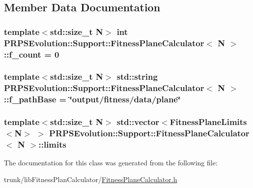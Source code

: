 \subsection{\-Member \-Data \-Documentation}
\hypertarget{class_p_r_p_s_evolution_1_1_support_1_1_fitness_plane_calculator_a3caff6f9344aa5fe2acd0815b2d55bbe}{
\subsubsection[{f\-\_\-count}]{\setlength{\rightskip}{0pt plus 5cm}template$<$std\-::size\-\_\-t \-N$>$ int {\bf \-P\-R\-P\-S\-Evolution\-::\-Support\-::\-Fitness\-Plane\-Calculator}$<$ \-N $>$\-::{\bf f\-\_\-count} = 0}}\label{class_p_r_p_s_evolution_1_1_support_1_1_fitness_plane_calculator_a3caff6f9344aa5fe2acd0815b2d55bbe}
\hypertarget{class_p_r_p_s_evolution_1_1_support_1_1_fitness_plane_calculator_ac49be73b0a0e5e8642f3a328061f75cb}{
\subsubsection[{f\-\_\-path\-Base}]{\setlength{\rightskip}{0pt plus 5cm}template$<$std\-::size\-\_\-t \-N$>$ std\-::string {\bf \-P\-R\-P\-S\-Evolution\-::\-Support\-::\-Fitness\-Plane\-Calculator}$<$ \-N $>$\-::{\bf f\-\_\-path\-Base} = \char`\"{}output/fitness/data/plane\char`\"{}}}\label{class_p_r_p_s_evolution_1_1_support_1_1_fitness_plane_calculator_ac49be73b0a0e5e8642f3a328061f75cb}
\hypertarget{class_p_r_p_s_evolution_1_1_support_1_1_fitness_plane_calculator_a9caf2e6ac9dec08e8d052c57f0455f18}{
\subsubsection[{limits}]{\setlength{\rightskip}{0pt plus 5cm}template$<$std\-::size\-\_\-t \-N$>$ std\-::vector$<${\bf \-Fitness\-Plane\-Limits}$<$\-N$>$ $>$ {\bf \-P\-R\-P\-S\-Evolution\-::\-Support\-::\-Fitness\-Plane\-Calculator}$<$ \-N $>$\-::{\bf limits}}}\label{class_p_r_p_s_evolution_1_1_support_1_1_fitness_plane_calculator_a9caf2e6ac9dec08e8d052c57f0455f18}


\-The documentation for this class was generated from the following file\-:\begin{DoxyCompactItemize}
\item 
trunk/lib\-Fitness\-Plan\-Calculator/\hyperlink{_fitness_plane_calculator_8h}{\-Fitness\-Plane\-Calculator.\-h}\end{DoxyCompactItemize}
